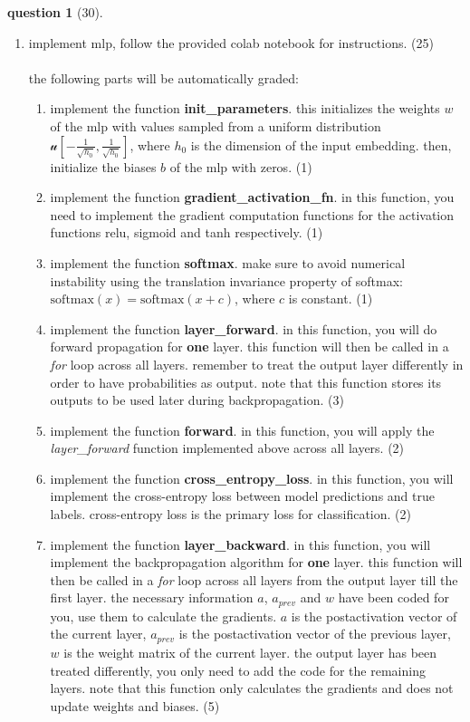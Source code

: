 \documentclass[12pt]{article}
\theoremstyle{definition}
\newtheorem{exercise}{question}%
\begin{document}
\begin{exercise}[30]
{\begin{enumerate}[label=(\theexercise.\arabic*)]
    \vspace{0.3cm}
    \item implement mlp, follow the provided colab notebook for instructions. (25) \\ \\
    the following parts will be automatically graded:
    \begin{enumerate}
        \item implement the function \textbf{init\_parameters}. this initializes the weights $w$ of the mlp with values sampled from a uniform distribution $\mathcal{u}\left[-\frac{1}{\sqrt{h_0}}, \frac{1}{\sqrt{h_0}}\right]$, where $h_0$ is the dimension of the input embedding. then, initialize the biases $b$ of the mlp with zeros. (1)
        \item implement the function \textbf{gradient\_activation\_fn}. in this function, you need to implement the gradient computation functions for the activation functions relu, sigmoid and tanh respectively. (1)
        \item implement the function \textbf{softmax}. make sure to avoid numerical instability using the translation invariance property of softmax: $\text{softmax}(x) = \text{softmax}(x + c)$, where $c$ is constant. (1)
        \item implement the function \textbf{layer\_forward}. in this function, you will do forward propagation for \textbf{one} layer. this function will then be called in a \textit{for} loop across all layers. remember to treat the output layer differently in order to have probabilities as output. note that this function stores its outputs to be used later during backpropagation. (3)
        \item implement the function \textbf{forward}. in this function, you will apply the \textit{layer\_forward} function implemented above across all layers. (2)
        \item implement the function \textbf{cross\_entropy\_loss}. in this function, you will implement the cross-entropy loss between model predictions and true labels. cross-entropy loss is the primary loss for classification. (2)
        \item implement the function \textbf{layer\_backward}. in this function, you will implement the backpropagation algorithm for \textbf{one} layer. this function will then be called in a \textit{for} loop across all layers from the output layer till the first layer. the necessary information $a$, $a_{prev}$ and $w$ have been coded for you, use them to calculate the gradients. $a$ is the postactivation vector of the current layer, $a_{prev}$ is the postactivation vector of the previous layer, $w$ is the weight matrix of the current layer. the output layer has been treated differently, you only need to add the code for the remaining layers. note that this function only calculates the gradients and does not update weights and biases. (5)

\end{enumerate}
\end{enumerate}}
\end{exercise}
\end{document}
